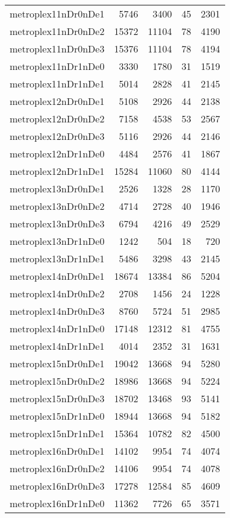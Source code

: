 \begin{tabular}{lrrrr}
metroplex11nDr0nDe1 & 5746 & 3400 & 45 & 2301 \\
metroplex11nDr0nDe2 & 15372 & 11104 & 78 & 4190 \\
metroplex11nDr0nDe3 & 15376 & 11104 & 78 & 4194 \\
metroplex11nDr1nDe0 & 3330 & 1780 & 31 & 1519 \\
metroplex11nDr1nDe1 & 5014 & 2828 & 41 & 2145 \\
metroplex12nDr0nDe1 & 5108 & 2926 & 44 & 2138 \\
metroplex12nDr0nDe2 & 7158 & 4538 & 53 & 2567 \\
metroplex12nDr0nDe3 & 5116 & 2926 & 44 & 2146 \\
metroplex12nDr1nDe0 & 4484 & 2576 & 41 & 1867 \\
metroplex12nDr1nDe1 & 15284 & 11060 & 80 & 4144 \\
metroplex13nDr0nDe1 & 2526 & 1328 & 28 & 1170 \\
metroplex13nDr0nDe2 & 4714 & 2728 & 40 & 1946 \\
metroplex13nDr0nDe3 & 6794 & 4216 & 49 & 2529 \\
metroplex13nDr1nDe0 & 1242 & 504 & 18 & 720 \\
metroplex13nDr1nDe1 & 5486 & 3298 & 43 & 2145 \\
metroplex14nDr0nDe1 & 18674 & 13384 & 86 & 5204 \\
metroplex14nDr0nDe2 & 2708 & 1456 & 24 & 1228 \\
metroplex14nDr0nDe3 & 8760 & 5724 & 51 & 2985 \\
metroplex14nDr1nDe0 & 17148 & 12312 & 81 & 4755 \\
metroplex14nDr1nDe1 & 4014 & 2352 & 31 & 1631 \\
metroplex15nDr0nDe1 & 19042 & 13668 & 94 & 5280 \\
metroplex15nDr0nDe2 & 18986 & 13668 & 94 & 5224 \\
metroplex15nDr0nDe3 & 18702 & 13468 & 93 & 5141 \\
metroplex15nDr1nDe0 & 18944 & 13668 & 94 & 5182 \\
metroplex15nDr1nDe1 & 15364 & 10782 & 82 & 4500 \\
metroplex16nDr0nDe1 & 14102 & 9954 & 74 & 4074 \\
metroplex16nDr0nDe2 & 14106 & 9954 & 74 & 4078 \\
metroplex16nDr0nDe3 & 17278 & 12584 & 85 & 4609 \\
metroplex16nDr1nDe0 & 11362 & 7726 & 65 & 3571 \\

\end{tabular}
